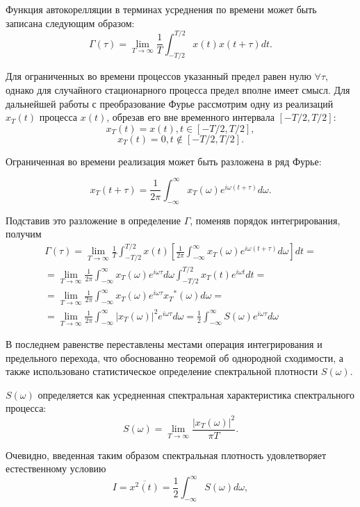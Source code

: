 \documentclass{urticle}
\begin{document}
Функция автокорелляции в терминах усреднения по времени может быть записана следующим образом:
	$$\Gamma(\tau) = \lim\limits_{T\rightarrow\infty} \frac{1}{T} \int_{-T/2}^{T/2} x(t)x(t+\tau)dt.$$
	
Для ограниченных во времени процессов указанный предел равен нулю $\forall \tau$, однако для случайного стационарного процесса предел вполне имеет смысл. Для дальнейшей работы с преобразование Фурье рассмотрим одну из реализаций $x_T(t)$ процесса $x(t)$, обрезав его вне временного интервала $[-T/2, T/2]$:
$$x_T(t) = x(t), t \in [-T/2, T/2],$$
$$x_T(t) = 0 ,  t \notin [-T/2, T/2].$$

Ограниченная во времени реализация может быть разложена в ряд Фурье:

$$x_T(t+\tau) = \frac{1}{2\pi}\int_{-\infty}^{\infty}x_T(\omega)e^{i\omega(t+\tau)}d\omega.$$

Подставив это разложение в определение $\Gamma$, поменяв порядок интегрирования, получим
\begin{multline*}
	\Gamma(\tau) = \lim\limits_{T\rightarrow\infty} \frac{1}{T} \int_{-T/2}^{T/2} x(t) \left[ \frac{1}{2\pi}\int_{-\infty}^{\infty}x_T(\omega)e^{i\omega(t+\tau)}d\omega \right ] dt =\\
	=\lim\limits_{T\rightarrow\infty} \frac{1}{2\pi}\int_{-\infty}^{\infty}x_T(\omega)e^{i\omega\tau}d\omega \int_{-T/2}^{T/2} x_T(t) e^{i \omega t} dt =\\
	=\lim\limits_{T\rightarrow\infty} \frac{1}{2\pi}\int_{-\infty}^{\infty}x_T(\omega)e^{i\omega\tau} {x_T}^*(\omega) d\omega =\\
	=\lim\limits_{T\rightarrow\infty} \frac{1}{2\pi}\int_{-\infty}^{\infty}|x_T(\omega)|^2 e^{i\omega\tau} d\omega = \frac{1}{2}\int_{-\infty}^{\infty} S(\omega) e^{i\omega \tau} d \omega 
\end{multline*}

В последнем равенстве переставлены местами операция интегрирования и предельного перехода, что обоснованно теоремой об однородной сходимости, а также использовано статистическое определение спектральной плотности $S(\omega)$.

$S(\omega)$ определяется как усредненная спектральная характеристика спектрального процесса:
$$S(\omega) = \lim\limits_{T\rightarrow\infty} \frac{|x_T(\omega)|^2}{\pi T}.$$

Очевидно, введенная таким образом спектральная плотность удовлетворяет естественному условию
$$I = \overline{x^2(t)} = \frac{1}{2} \int_{-\infty}^{\infty} S(\omega) d\omega,$$
\end{document}
